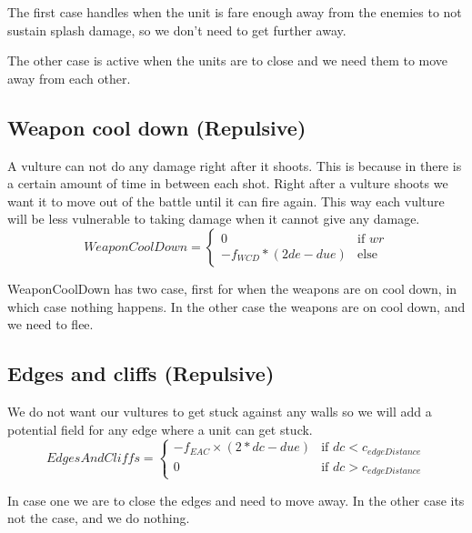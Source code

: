 	The first case handles when the unit is fare enough away from the enemies to not sustain splash damage, so we don't need to get further away.
	
	The other case is active when the units are to close and we need them to move away from each other.
	
	\subsection*{Weapon cool down (Repulsive)}
A vulture can not do any damage right after it shoots. This is because in there is a certain amount of time in between each shot. Right after a vulture shoots we want it to move out of the battle until it can fire again. This way each vulture will be less vulnerable to taking damage when it cannot give any damage.
		\begin{displaymath}
			WeaponCoolDown = \begin{cases}
					0 & \text{if } wr\\
					-f_{WCD} * (2de - due) & \text{else}
				\end{cases}		
		\end{displaymath}

    WeaponCoolDown has two case, first for when the weapons are on cool down, in which case nothing happens. In the other case the weapons are on cool down, and we need to flee.        
    
	\subsection*{Edges and cliffs (Repulsive)}
		We do not want our vultures to get stuck against any walls so we will add a potential field for any edge where a unit can get stuck.
		\begin{displaymath}
			EdgesAndCliffs = \begin{cases}
					-f_{EAC} \times {(2*dc - due)} & \text{if } dc < c_{edgeDistance}\\
					0 & \text{if } dc > c_{edgeDistance}
				\end{cases}		
		\end{displaymath}

    In case one we are to close the edges and need to move away. In the other case its not the case, and we do nothing.   

